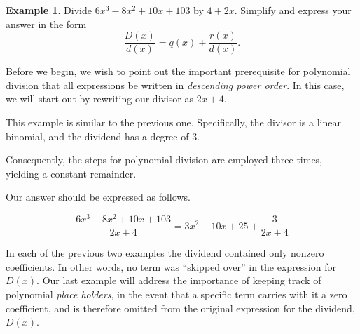 \documentclass[12pt]{book}
\theoremstyle{definition}
\newtheorem{example}{Example}
\begin{document}
\begin{example} Divide $6x^3-8x^2+10x+103$ by $4+2x$.  Simplify and express your answer in the form
$$\frac{D(x)}{d(x)}=q(x)+\dfrac{r(x)}{d(x)}.$$

Before we begin, we wish to point out the important prerequisite for polynomial division that all expressions be written in {\it descending power order}.  In this case, we will start out by rewriting our divisor as $2x+4$.

\begin{multicols}{2}

\columnbreak

This example is similar to the previous one.  Specifically,
the divisor is a linear binomial, and the dividend has a degree of $3$.
\par
Consequently, the steps for polynomial division are employed three times, yielding a constant remainder.
\par
Our answer should be expressed as follows.
\end{multicols}
$$\frac{6x^3-8x^2+10x+103}{2x+4}=3x^2-10x+25+\frac{3}{2x+4}$$
\end{example}

In each of the previous two examples the dividend contained only nonzero coefficients.  In other words, no term was ``skipped over'' in the expression for $D(x)$.  Our last example will address the importance of keeping track of polynomial {\it place holders}, in the event that a specific term carries with it a zero coefficient, and is therefore omitted from the original expression for the dividend, $D(x)$.
\par
\end{document}
